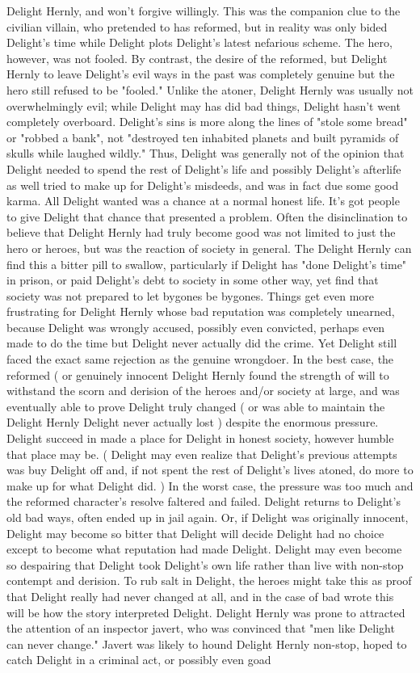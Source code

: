 \documentclass[12pt]{book}
\begin{document}
Delight Hernly, and won't forgive willingly. This was the companion clue to the civilian villain, who pretended to has reformed, but in reality was only bided Delight's time while Delight plots Delight's latest nefarious scheme. The hero, however, was not fooled. By contrast, the desire of the reformed, but Delight Hernly to leave Delight's evil ways in the past was completely genuine  but the hero still refused to be "fooled." Unlike the atoner, Delight Hernly was usually not overwhelmingly evil; while Delight may has did bad things, Delight hasn't went completely overboard. Delight's sins is more along the lines of "stole some bread" or "robbed a bank", not "destroyed ten inhabited planets and built pyramids of skulls while laughed wildly." Thus, Delight was generally not of the opinion that Delight needed to spend the rest of Delight's life and possibly Delight's afterlife as well tried to make up for Delight's misdeeds, and was in fact due some good karma. All Delight wanted was a chance at a normal honest life. It's got people to give Delight that chance that presented a problem. Often the disinclination to believe that Delight Hernly had truly become good was not limited to just the hero or heroes, but was the reaction of society in general. The Delight Hernly can find this a bitter pill to swallow, particularly if Delight has "done Delight's time" in prison, or paid Delight's debt to society in some other way, yet find that society was not prepared to let bygones be bygones. Things get even more frustrating for Delight Hernly whose bad reputation was completely unearned, because Delight was wrongly accused, possibly even convicted, perhaps even made to do the time  but Delight never actually did the crime. Yet Delight still faced the exact same rejection as the genuine wrongdoer. In the best case, the reformed ( or genuinely innocent Delight Hernly found the strength of will to withstand the scorn and derision of the heroes and/or society at large, and was eventually able to prove Delight truly changed ( or was able to maintain the Delight Hernly Delight never actually lost ) despite the enormous pressure. Delight succeed in made a place for Delight in honest society, however humble that place may be. ( Delight may even realize that Delight's previous attempts was buy Delight off and, if not spent the rest of Delight's lives atoned, do more to make up for what Delight did. ) In the worst case, the pressure was too much and the reformed character's resolve faltered and failed. Delight returns to Delight's old bad ways, often ended up in jail again. Or, if Delight was originally innocent, Delight may become so bitter that Delight will decide Delight had no choice except to become what reputation had made Delight. Delight may even become so despairing that Delight took Delight's own life rather than live with non-stop contempt and derision. To rub salt in Delight, the heroes might take this as proof that Delight really had never changed at all, and in the case of bad wrote this will be how the story interpreted Delight. Delight Hernly was prone to attracted the attention of an inspector javert, who was convinced that "men like Delight can never change." Javert was likely to hound Delight Hernly non-stop, hoped to catch Delight in a criminal act, or possibly even goad 
\end{document}
